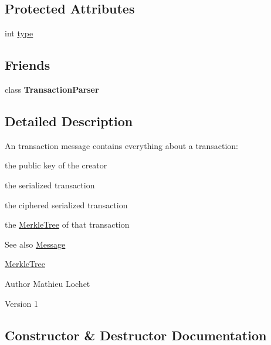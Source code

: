 \subsection*{Protected Attributes}
\begin{DoxyCompactItemize}
\item 
int \mbox{\hyperlink{classMessage_afbfb481c98b13d0deba0bac443bebe29}{type}}
\end{DoxyCompactItemize}
\subsection*{Friends}
\begin{DoxyCompactItemize}
\item 
\mbox{\label{classTransactionMessage_a760b1478b5214c122458f0f19d45c127}} 
class {\bfseries Transaction\+Parser}
\end{DoxyCompactItemize}


\subsection{Detailed Description}
An transaction message contains everything about a transaction\+:
\begin{DoxyItemize}
\item the public key of the creator
\item the serialized transaction
\item the ciphered serialized transaction
\item the \mbox{\hyperlink{classMerkleTree}{Merkle\+Tree}} of that transaction \begin{DoxySeeAlso}{See also}
\mbox{\hyperlink{classMessage}{Message}} 

\mbox{\hyperlink{classMerkleTree}{Merkle\+Tree}}
\end{DoxySeeAlso}
\begin{DoxyAuthor}{Author}
Mathieu Lochet 
\end{DoxyAuthor}
\begin{DoxyVersion}{Version}
1 
\end{DoxyVersion}

\end{DoxyItemize}

\subsection{Constructor \& Destructor Documentation}
\mbox{\label{classTransactionMessage_a1be404df5185ea0912d23da9f2918649}} 
